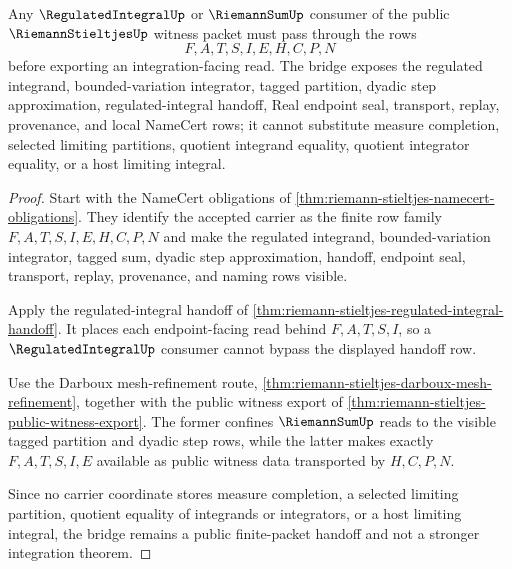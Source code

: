 \begin{theorem}
\label{thm:riemann-stieltjes-regulated-integral-public-bridge}
Any $\RegulatedIntegralUp$ or $\RiemannSumUp$ consumer of the public $\RiemannStieltjesUp$ witness packet must pass through the rows
$$
F,A,T,S,I,E,H,C,P,N
$$
before exporting an integration-facing read. The bridge exposes the regulated integrand, bounded-variation integrator, tagged partition, dyadic step approximation, regulated-integral handoff, Real endpoint seal, transport, replay, provenance, and local NameCert rows; it cannot substitute measure completion, selected limiting partitions, quotient integrand equality, quotient integrator equality, or a host limiting integral.
\end{theorem}
\begin{proof}
Start with the NameCert obligations of \autoref{thm:riemann-stieltjes-namecert-obligations}. They identify the accepted carrier as the finite row family $F,A,T,S,I,E,H,C,P,N$ and make the regulated integrand, bounded-variation integrator, tagged sum, dyadic step approximation, handoff, endpoint seal, transport, replay, provenance, and naming rows visible.

Apply the regulated-integral handoff of \autoref{thm:riemann-stieltjes-regulated-integral-handoff}. It places each endpoint-facing read behind $F,A,T,S,I$, so a $\RegulatedIntegralUp$ consumer cannot bypass the displayed handoff row.

Use the Darboux mesh-refinement route, \autoref{thm:riemann-stieltjes-darboux-mesh-refinement}, together with the public witness export of \autoref{thm:riemann-stieltjes-public-witness-export}. The former confines $\RiemannSumUp$ reads to the visible tagged partition and dyadic step rows, while the latter makes exactly $F,A,T,S,I,E$ available as public witness data transported by $H,C,P,N$.

Since no carrier coordinate stores measure completion, a selected limiting partition, quotient equality of integrands or integrators, or a host limiting integral, the bridge remains a public finite-packet handoff and not a stronger integration theorem.
\end{proof}


